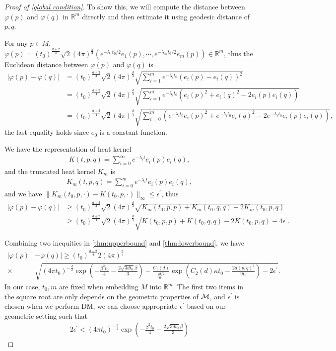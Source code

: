 \begin{proof}[Proof of \cref{global condition}]
	To show this, we will compute the distance between $\varphi(p)$ and $\varphi(q)$ in $\mathbb{R}^m$ directly and then estimate it using geodesic distance of $p,q$.
	
	For any $p \in M$, $\varphi(p)=(t_0)^\frac{d+2}{4}\sqrt{2}(4\pi)^\frac{d}{4}\left(e^{-\lambda_1 t_0/2}e_1(p),\cdots,e^{-\lambda_m t_0/2}e_m(p)\right) \in \mathbb{R}^m$, thus the Euclidean distance between $\varphi(p)$ and $\varphi(q)$ is
	\begin{align}
		|\varphi(p)-\varphi(q)|&=(t_0)^\frac{d+2}{4}\sqrt{2}(4\pi)^\frac{d}{4} \sqrt{\sum_{i=1}^me^{-\lambda_i t_0}(e_i(p)-e_i(q))^2}\\
		&=(t_0)^\frac{d+2}{4}\sqrt{2}(4\pi)^\frac{d}{4}\sqrt{\sum_{i=1}^me^{-\lambda_i t_0}(e_i(p)^2+e_i(q)^2-2e_i(p)e_i(q))} \\
		&=(t_0)^\frac{d+2}{4}\sqrt{2}(4\pi)^\frac{d}{4}\sqrt{\sum_{i=0}^m(e^{-\lambda_i t_0}e_i(p)^2+e^{-\lambda_i t_0}e_i(q)^2-2e^{-\lambda_i t_0}e_i(p)e_i(q))},
	\end{align}
	the last equality holds since $e_0$ is a constant function.
	
	
	We have the representation of heat kernel
	\begin{align}
		K(t,p,q)=\sum_{i=0}^{\infty} e^{-\lambda_i t} e_i(p) e_i(q),
	\end{align}
	and the truncated heat kernel $K_m$ is
	\begin{align}
		K_m(t,p,q)=\sum_{i=0}^{m} e^{-\lambda_i t} e_i(p) e_i(q),
	\end{align}
	and we have $\|K_m(t_0,p,\cdot)-K(t_0,p,\cdot)\|_{\infty} \leq \epsilon^\prime$,
	thus 
	\begin{align}
		|\varphi(p)-\varphi(q)|&\geq (t_0)^\frac{d+2}{4}\sqrt{2}(4\pi)^\frac{d}{4} \sqrt{K_m(t_0,p,p)+K_m(t_0,q,q)-2K_m(t_0,p,q)}\\
		&\geq (t_0)^\frac{d+2}{4}\sqrt{2}(4\pi)^\frac{d}{4} \sqrt{K(t_0,p,p)+K(t_0,q,q)-2 K(t_0,p,q)-4\epsilon^\prime}.
	\end{align}
	
	Combining two inequities in \cref{thm:upperbound} and \cref{thm:lowerbound}, we have
	\begin{align}
		|\varphi(p)&-\varphi(q)|\geq (t_0)^\frac{d+2}{4}2(4\pi)^\frac{d}{4}  \nonumber \\ \times &\sqrt{(4\pi t_0)^{-\frac{d}{2}} \exp\left(-\frac{\beta^2t_0}{4}-\frac{2\sqrt{3dt_0}\beta}{3}\right) - \frac{C_1(d)}{t_0^{d/2}}\exp\left(C_2(d)\kappa t_0 - \frac{2d(p,q)^2}{9t_0}\right) - 2\epsilon^\prime}. \label{sqrt_dis}
	\end{align}
	In our case, $t_0, m$ are fixed when embedding $M$ into $\mathbb{R}^m$. The first two items in the square root
	are only depends on the geometric properties of $\mathcal{M}$, and $\epsilon^\prime$ is chosen when we perform DM, we can choose appropriate $\epsilon^{\prime}$ based on our geometric setting such that 
	\begin{align}
		2\epsilon^{\prime}<(4\pi t_0)^{-\frac{d}{2}} \exp\left(-\frac{\beta^2t_0}{4}-\frac{2\sqrt{3dt_0}\beta}{3}\right)
	\end{align}
	

\end{proof}

